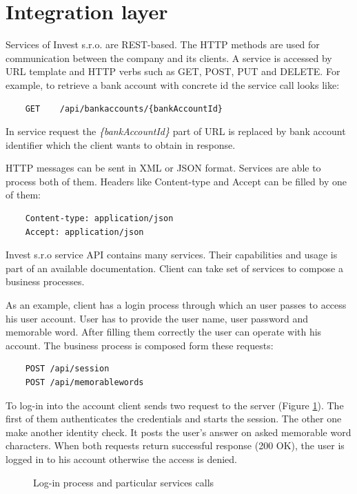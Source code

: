 \section{Integration layer}
Services of Invest s.r.o. are REST-based. The HTTP methods are used for communication between the company and its clients. A service is accessed by URL template and HTTP verbs such as GET, POST, PUT and DELETE. For example, to retrieve a bank account with concrete id the service call looks like: 

\begin{lstlisting}
    GET    /api/bankaccounts/{bankAccountId}
\end{lstlisting}

In service request the \emph{\{bankAccountId\}} part of URL is replaced by bank account identifier which the client wants to obtain in response.

HTTP messages can be sent in XML or JSON format. Services are able to process both of them. Headers like Content-type and Accept can be filled by one of them:
 
\begin{lstlisting}
    Content-type: application/json
    Accept: application/json
\end{lstlisting}

Invest s.r.o service API contains many services. Their capabilities and usage is part of an available \gls{documentation}. Client can take set of services to compose a business processes. 

As an example, client has a login process through which an user passes to access his user account. User has to provide the user name, user password and memorable word. After filling them correctly the user can operate with his account. The business process is composed form these requests:

\begin{lstlisting}
    POST /api/session
    POST /api/memorablewords
\end{lstlisting}
  
To log-in into the account client sends two request to the server (Figure \ref{fig:login-process}). The first of them authenticates the credentials and starts the session. The other one make another identity check. It posts the user's answer on asked memorable word characters. When both requests return successful response (200 OK), the user is logged in to his account otherwise the access is denied.

\begin{figure}[htp] 
\caption{Log-in process and particular services calls}
\label{fig:login-process}
\end{figure} 

